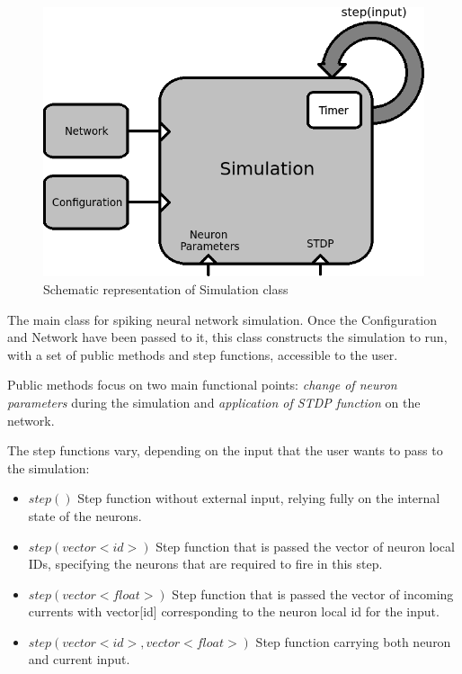 \begin{figure}[h!]
\begin{center}
\includegraphics[scale = 0.7]{images/simulation_scheme.png}
\end{center}
\caption{Schematic representation of Simulation class}
\end{figure}


The main class for spiking neural network simulation. Once the Configuration and Network have been passed to it, this class constructs the simulation to run, with a set of public methods and step functions, accessible to the user.

Public methods focus on two main functional points: \emph{change of neuron parameters} during the simulation and \emph{application of STDP function} on the network.

The step functions vary, depending on the input that the user wants to pass to the simulation:

\begin{itemize}
\item{$step()$} Step function without external input, relying fully on the internal state of the neurons.
\item{$step(vector<id>)$} Step function that is passed the vector of neuron local IDs, specifying the neurons that are required to fire in this step.
\item{$step(vector<float>)$} Step function that is passed the vector of incoming currents with vector[id] corresponding to the neuron local id for the input.
\item{$step(vector<id>, vector<float>)$} Step function carrying both neuron and current input.
\end{itemize}

